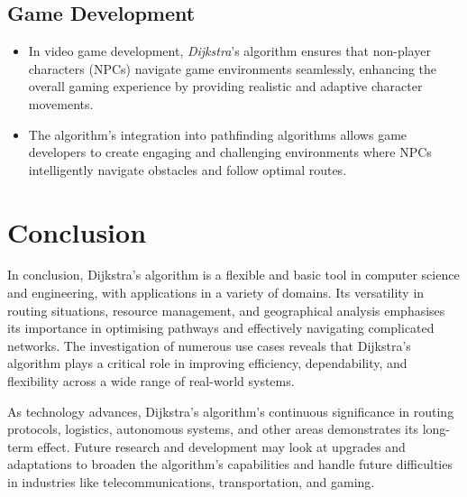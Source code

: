 \documentclass[12pt, a4paper]{article}
\begin{document}
\subsection{Game Development}
\begin{itemize}
  \item In video game development, \textit{Dijkstra}'s algorithm ensures that non-player characters (NPCs) navigate game environments seamlessly, enhancing the overall gaming experience by providing realistic and adaptive character movements.
  \item The algorithm's integration into pathfinding algorithms allows game developers to create engaging and challenging environments where NPCs intelligently navigate obstacles and follow optimal routes.
 
\end{itemize}


\section{Conclusion}

In conclusion, Dijkstra's algorithm is a flexible and basic tool in computer science and engineering, with applications in a variety of domains. Its versatility in routing situations, resource management, and geographical analysis emphasises its importance in optimising pathways and effectively navigating complicated networks. The investigation of numerous use cases reveals that Dijkstra's algorithm plays a critical role in improving efficiency, dependability, and flexibility across a wide range of real-world systems.

As technology advances, Dijkstra's algorithm's continuous significance in routing protocols, logistics, autonomous systems, and other areas demonstrates its long-term effect. Future research and development may look at upgrades and adaptations to broaden the algorithm's capabilities and handle future difficulties in industries like telecommunications, transportation, and gaming.





\pagebreak



\end{document}
